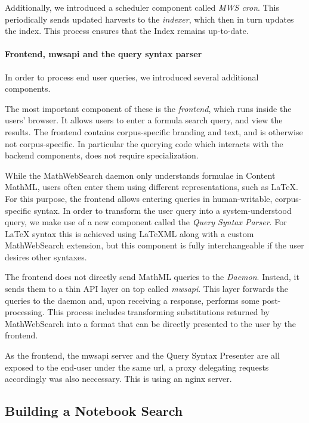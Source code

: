 Additionally, we introduced a scheduler component called \textit{MWS cron}. 
This periodically sends updated harvests to the \textit{indexer}, which then in turn updates the index. 
This process ensures that the Index remains up-to-date. 

\paragraph{Frontend, mwsapi and the query syntax parser}

In order to process end user queries, we introduced several additional components.

The most important component of these is the \textit{frontend}, which runs inside the users' browser. 
It allows users to enter a formula search query, and view the results. 
The frontend contains corpus-specific branding and text, and is otherwise not corpus-specific. 
In particular the querying code which interacts with the backend components, does not require specialization. 

While the MathWebSearch daemon only understands formulae in Content MathML, users often enter them using different representations, such as \LaTeX. 
For this purpose, the frontend allows entering queries in human-writable, corpus-specific syntax. 
In order to transform the user query into a system-understood query, we make use of a new component called the \textit{Query Syntax Parser}. 
For {\LaTeX} syntax this is achieved using {\LaTeX}ML along with a custom MathWebSearch extension, but this component is fully interchangeable if the user desires other syntaxes. 

The frontend does not directly send MathML queries to the \textit{Daemon}.
Instead, it sends them to a thin API layer on top called \textit{mwsapi}. 
This layer forwards the queries to the daemon and, upon receiving a response, performs some post-processing. 
This process includes transforming substitutions returned by MathWebSearch into a format that can be directly presented to the user by the frontend. 

As the frontend, the mwsapi server and the Query Syntax Presenter are all exposed to the end-user under the same url, a proxy delegating requests accordingly was also neccessary. 
This is using an nginx  server. 

\subsection{Building a Notebook Search}

